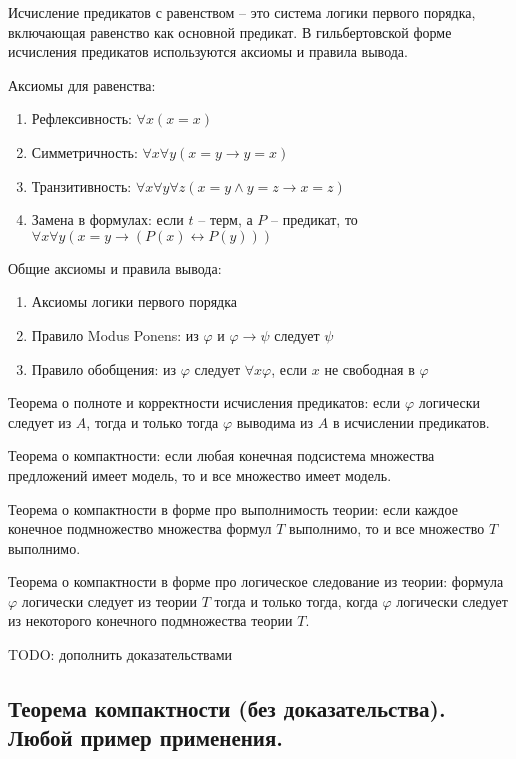 \documentclass[a4paper, 10pt]{article}
\begin{document}
Исчисление предикатов с равенством -- это система логики первого порядка, включающая равенство как основной предикат. В гильбертовской форме исчисления предикатов используются аксиомы и правила вывода.

Аксиомы для равенства:

\begin{enumerate}
    \item Рефлексивность: $\forall x (x=x)$
    \item Симметричность: $\forall x \forall y (x=y \to y=x)$
    \item Транзитивность: $\forall x\forall y\forall z (x=y\land y=z \to x=z)$
    \item Замена в формулах: если $t$ -- терм, а $P$ -- предикат, то $\forall x\forall y (x=y \to (P(x)\leftrightarrow P(y)))$
\end{enumerate}

Общие аксиомы и правила вывода:

\begin{enumerate}
    \item Аксиомы логики первого порядка
    \item Правило Modus Ponens: из $\varphi$ и $\varphi\to\psi$ следует $\psi$
    \item Правило обобщения: из $\varphi$ следует $\forall x\varphi$, если $x$ не свободная в $\varphi$
\end{enumerate}

Теорема о полноте и корректности исчисления предикатов: если $\varphi$ логически следует из $A$, тогда и только тогда $\varphi$ выводима из $A$ в исчислении предикатов.

\hfill

Теорема о компактности: если любая конечная подсистема множества предложений имеет модель, то и все множество имеет модель.

Теорема о компактности в форме про выполнимость теории: если каждое конечное подмножество множества формул $T$ выполнимо, то и все множество $T$ выполнимо.

Теорема о компактности в форме про логическое следование из теории: формула $\varphi$ логически следует из теории $T$ тогда и только тогда, когда $\varphi$ логически следует из некоторого конечного подмножества теории $T$.

TODO: дополнить доказательствами

\subsection{Теорема компактности (без доказательства). Любой пример применения.}
\end{document}
